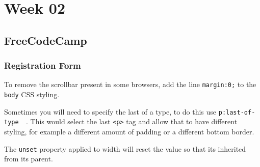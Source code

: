 \chapter{Week 02}
\section{FreeCodeCamp}
\subsection{Registration Form}
To remove the scrollbar present in some browsers, add the line \texttt{margin:0;} to the \texttt{body} CSS styling.

Sometimes you will need to specify the last of a type, to do this use \texttt{p:last-of-type {  }}. This would select the last \texttt{<p>} tag and allow that to have different styling, for example a different amount of padding or a different bottom border.

The \texttt{unset} property applied to width will reset the value so that its inherited from its parent.